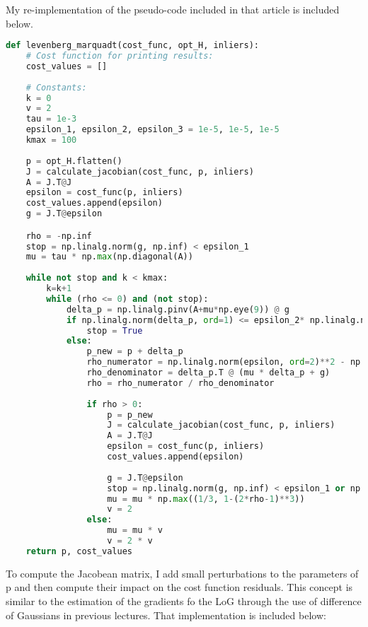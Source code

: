 \documentclass{article}
\begin{document}
My re-implementation of the pseudo-code included in that article is included below.
\begin{lstlisting}[language=Python]
def levenberg_marquadt(cost_func, opt_H, inliers):
    # Cost function for printing results:
    cost_values = []
    
    # Constants:
    k = 0
    v = 2
    tau = 1e-3
    epsilon_1, epsilon_2, epsilon_3 = 1e-5, 1e-5, 1e-5
    kmax = 100
    
    p = opt_H.flatten()
    J = calculate_jacobian(cost_func, p, inliers)
    A = J.T@J
    epsilon = cost_func(p, inliers)
    cost_values.append(epsilon)
    g = J.T@epsilon

    rho = -np.inf    
    stop = np.linalg.norm(g, np.inf) < epsilon_1
    mu = tau * np.max(np.diagonal(A))
    
    while not stop and k < kmax:
        k=k+1
        while (rho <= 0) and (not stop):
            delta_p = np.linalg.pinv(A+mu*np.eye(9)) @ g
            if np.linalg.norm(delta_p, ord=1) <= epsilon_2* np.linalg.norm(p, ord=1):
                stop = True
            else:
                p_new = p + delta_p
                rho_numerator = np.linalg.norm(epsilon, ord=2)**2 - np.linalg.norm(cost_func(p_new, inliers), ord=2)**2
                rho_denominator = delta_p.T @ (mu * delta_p + g)
                rho = rho_numerator / rho_denominator
                
                if rho > 0:
                    p = p_new
                    J = calculate_jacobian(cost_func, p, inliers)
                    A = J.T@J
                    epsilon = cost_func(p, inliers)
                    cost_values.append(epsilon)
                    
                    g = J.T@epsilon
                    stop = np.linalg.norm(g, np.inf) < epsilon_1 or np.linalg.norm(epsilon, ord=2) <= epsilon_3
                    mu = mu * np.max((1/3, 1-(2*rho-1)**3))
                    v = 2
                else:
                    mu = mu * v
                    v = 2 * v
    return p, cost_values
\end{lstlisting}

To compute the Jacobean matrix, I add small perturbations to the parameters of p and then compute their impact on the cost function residuals. This concept is similar to the estimation of the gradients fo the LoG through the use of difference of Gaussians in previous lectures. That implementation is included below:
\end{document}
